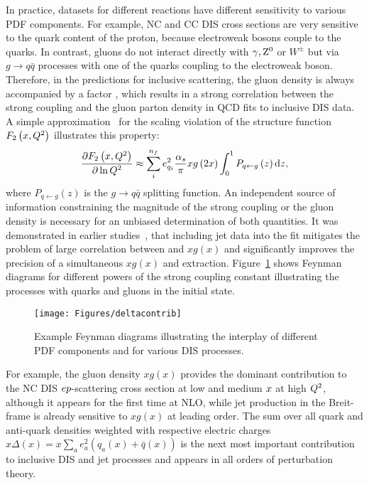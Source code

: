 In practice, datasets for different reactions have different sensitivity to various PDF components. For example, NC and CC DIS cross sections are very sensitive to the quark content of the proton, because electroweak bosons couple to the quarks. In contrast, gluons do not interact directly with $\gamma,\mbox{$\rm{Z}^0$}$ or $W^{\pm}$ but via $g\rightarrow q\bar q$ processes with one of the quarks coupling to the electroweak boson. Therefore, in the predictions for inclusive \ep scattering, the gluon density is always accompanied by a factor \as, which results in a strong correlation between the strong coupling and the gluon parton density in QCD fits to inclusive DIS data. A simple approximation~\cite{Prytz:1993vr} for the scaling violation of the structure function $F_2\left(x,\mbox{${Q^2}$} \right)$ illustrates this property:
\begin{equation}
 \frac{\partial F_2\left(x,\mbox{${Q^2}$} \right)}{\partial \ln \mbox{${Q^2}$}} \approx \sum_i^{n_f}e_{q_i}^2 \frac{\mbox{$\alpha_{s}$}}{\pi} xg\left(2x\right) \int_0^1 P_{q\leftarrow g}\left(z\right)\mathrm{d}z, 
\end{equation}
where $P_{q\leftarrow g}\left(z\right)$ is the $g\rightarrow q\bar q$ splitting function. An independent source of information constraining the magnitude of the strong coupling or the gluon density is necessary for an unbiased determination of both quantities. It was demonstrated in earlier studies~\cite{Chekanov:2005nn,H1prelim-11-143,ZEUS-prel-11-010}, that including jet data into the fit mitigates the problem of large correlation between \as and $xg\left(x\right)$ and significantly improves the precision of a simultaneous $xg\left(x\right)$ and \as extraction. Figure~\ref{fig:pdfcontributions} shows Feynman diagrams for different powers of the strong coupling constant illustrating the processes with quarks and gluons in the initial state.
\begin{figure}[htp]
 \centering
 \begin{center}
 \texttt{[image: Figures/deltacontrib]}
\end{center}
 \caption{Example Feynman diagrams illustrating the interplay of different PDF components and \as for various DIS processes.}
 \label{fig:pdfcontributions}
\end{figure}
For example, the gluon density $xg\left(x\right)$ provides the dominant contribution to the NC DIS $\mbox{$e p$}$-scattering cross section at low and medium $\mbox{${x}$}$ at high $\mbox{${Q^2}$}$, although it appears for the first time at NLO, while jet production in the Breit-frame is already sensitive to $xg\left(x\right)$ at leading order. The sum over all quark and anti-quark densities weighted with respective electric charges $x\Delta\left(x\right)=x\sum_{a}{e_a^2\left(q_a\left(x\right)+\bar{q}\left(x\right)\right)}$ is the next most important contribution to inclusive DIS and jet processes and appears in all orders of perturbation theory.
